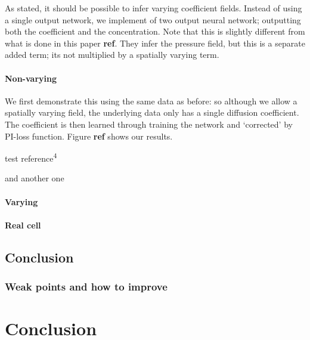 \documentclass[12pt,a4paper,]{harvard-thesis}
\begin{document}
As stated, it should be possible to infer varying coefficient fields.
Instead of using a single output network, we implement of two output
neural network; outputting both the coefficient and the concentration.
Note that this is slightly different from what is done in this paper
\textbf{ref}. They infer the pressure field, but this is a separate
added term; its not multiplied by a spatially varying term.

\hypertarget{non-varying}{%
\subsubsection*{Non-varying}\label{non-varying}}

We first demonstrate this using the same data as before: so although we
allow a spatially varying field, the underlying data only has a single
diffusion coefficient. The coefficient is then learned through training
the network and `corrected' by PI-loss function. Figure \textbf{ref}
shows our results.

test reference\textsuperscript{4}

and another one

\hypertarget{varying}{%
\subsubsection*{Varying}\label{varying}}

\hypertarget{real-cell}{%
\subsubsection{Real cell}\label{real-cell}}

\hypertarget{conclusion}{%
\section{Conclusion}\label{conclusion}}

\hypertarget{weak-points-and-how-to-improve}{%
\subsection{Weak points and how to
improve}\label{weak-points-and-how-to-improve}}

\hypertarget{conclusion-1}{%
\chapter{Conclusion}\label{conclusion-1}}
\end{document}
